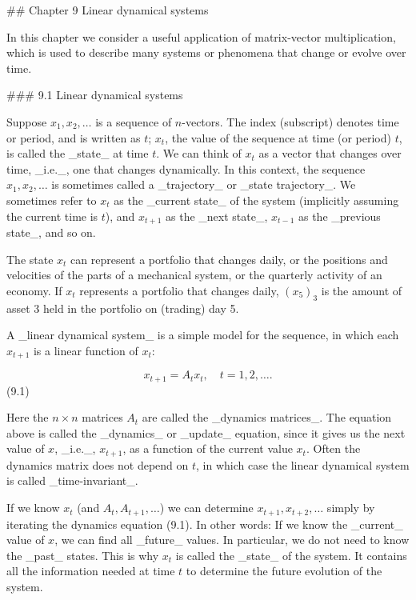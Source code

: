 

## Chapter 9 Linear dynamical systems

In this chapter we consider a useful application of matrix-vector multiplication, which is used to describe many systems or phenomena that change or evolve over time.

### 9.1 Linear dynamical systems

Suppose \(x_{1},x_{2},\ldots\) is a sequence of \(n\)-vectors. The index (subscript) denotes time or period, and is written as \(t\); \(x_{t}\), the value of the sequence at time (or period) \(t\), is called the _state_ at time \(t\). We can think of \(x_{t}\) as a vector that changes over time, _i.e._, one that changes dynamically. In this context, the sequence \(x_{1},x_{2},\ldots\) is sometimes called a _trajectory_ or _state trajectory_. We sometimes refer to \(x_{t}\) as the _current state_ of the system (implicitly assuming the current time is \(t\)), and \(x_{t+1}\) as the _next state_, \(x_{t-1}\) as the _previous state_, and so on.

The state \(x_{t}\) can represent a portfolio that changes daily, or the positions and velocities of the parts of a mechanical system, or the quarterly activity of an economy. If \(x_{t}\) represents a portfolio that changes daily, \((x_{5})_{3}\) is the amount of asset 3 held in the portfolio on (trading) day 5.

A _linear dynamical system_ is a simple model for the sequence, in which each \(x_{t+1}\) is a linear function of \(x_{t}\):

\[x_{t+1}=A_{t}x_{t},\quad t=1,2,\ldots.\] (9.1)

Here the \(n\times n\) matrices \(A_{t}\) are called the _dynamics matrices_. The equation above is called the _dynamics_ or _update_ equation, since it gives us the next value of \(x\), _i.e._, \(x_{t+1}\), as a function of the current value \(x_{t}\). Often the dynamics matrix does not depend on \(t\), in which case the linear dynamical system is called _time-invariant_.

If we know \(x_{t}\) (and \(A_{t},A_{t+1},\ldots\)) we can determine \(x_{t+1},x_{t+2},\ldots\) simply by iterating the dynamics equation (9.1). In other words: If we know the _current_ value of \(x\), we can find all _future_ values. In particular, we do not need to know the _past_ states. This is why \(x_{t}\) is called the _state_ of the system. It contains all the information needed at time \(t\) to determine the future evolution of the system.

